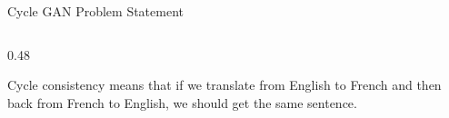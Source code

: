 \documentclass[aspectratio=169,xcolor=dvipsnames,svgnames,x11names,fleqn]{beamer}
\begin{document}
\begin{frame}{Cycle GAN Problem Statement}
\begin{columns}[T]
\begin{column}{0.48\textwidth}
            \vspace{1em}
            
            \begin{tcolorbox}[analogybox, title=~~]
                Cycle consistency means that if we translate from English to French and then back from French to English, we should get the same sentence.
            \end{tcolorbox}
        \end{column}
    \end{columns}

\end{frame}
\end{document}
